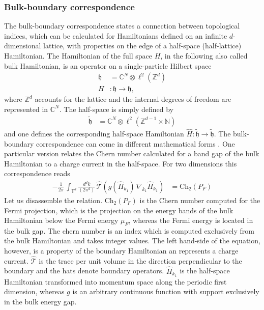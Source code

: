 \subsubsection{Bulk-boundary correspondence}\label{sec:bulk-boundary}
The bulk-boundary correspondence states a connection between topological indices, which can be calculated for Hamiltonians defined on an infinite $d$-dimensional lattice, with properties on the edge of a half-space (half-lattice) Hamiltonian. The Hamiltonian of the full space $H$, in the following also called bulk Hamiltonian, is an operator on a single-particle Hilbert space
\begin{align*}
    \mathfrak{h}&=\mathbb{C}^N \otimes \ell^2(\mathbb{Z}^d)\\
    H&:\mathfrak{h}\to\mathfrak{h},
\end{align*}
where $\mathbb{Z}^d$ accounts for the lattice and the internal degrees of freedom are represented in $\mathbb{C}^N$. The half-space is simply defined by
\begin{align*}
    \tilde{\mathfrak{h}}&=\mathbb{C}^N \otimes \ell^2(\mathbb{Z}^{d-1}\times\mathbb{N})
\end{align*}
and one defines the corresponding half-space Hamiltonian $\hat{H}:\tilde{\mathfrak{h}}\to\tilde{\mathfrak{h}}$.
The bulk-boundary correspondence can come in different mathematical forms \cite{prodanBulkBoundaryInvariants2016}. One particular version relates the Chern number calculated for a band gap of the bulk Hamiltonian to a charge current in the half-space. For two dimensions this correspondence reads \cite{prodanBulkBoundaryInvariants2016,peanoTopologicalEdgeStates2018}
\begin{align*}
    -\frac{1}{2\pi}\,\int_{\mathbb{T}^d}\frac{d^dk}{(2\pi^d)}\,\hat{\mathcal{T}}\left(g(\hat{H}_{k_1})\,\nabla_{k_1}\hat{H}_{k_1}\right)&= \text{Ch}_2(P_F)
\end{align*} 
Let us disassemble the relation. $\text{Ch}_2(P_F)$ is the Chern number computed for the Fermi projection, which is the projection on the energy bands of the bulk Hamiltonian below the Fermi energy $\mu_F$, whereas the Fermi energy is located in the bulk gap. The chern number is an index which is computed exclusively from the bulk Hamiltonian and takes integer values. The left hand-side of the equation, however, is a property of the boundary Hamiltonian an represents a charge current. $\hat{\mathcal{T}}$ is the trace per unit volume in the direction perpendicular to the boundary and the hats denote boundary operators. $\hat{H}_{k_1}$ is the half-space Hamiltonian transformed into momentum space along the periodic first dimension, whereas $g$ is an arbitrary continuous function with support exclusively in the bulk energy gap. 

